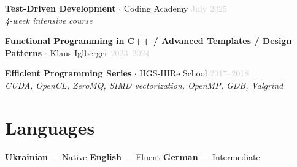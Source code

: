 \documentclass[11pt, a4paper]{article}
\begin{document}
\noindent
\textbf{Test-Driven Development} $\cdot$ Coding Academy \hfill \textcolor{lightgray}{July 2025}\\
\textit{4-week intensive course}

\vspace{5pt}
\noindent
\textbf{Functional Programming in C++ / Advanced Templates / Design Patterns} $\cdot$ Klaus Iglberger \hfill \textcolor{lightgray}{2023--2024}

\vspace{5pt}
\noindent
\textbf{Efficient Programming Series} $\cdot$ HGS-HIRe School \hfill \textcolor{lightgray}{2017--2018}\\
\textit{CUDA, OpenCL, ZeroMQ, SIMD vectorization, OpenMP, GDB, Valgrind}

\section{Languages}

\noindent
\textbf{Ukrainian} --- Native \quad
\textbf{English} --- Fluent \quad
\textbf{German} --- Intermediate
\end{document}
